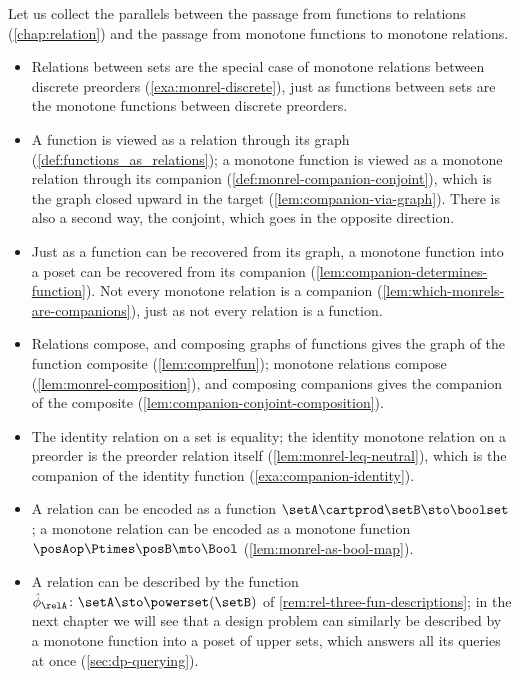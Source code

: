 Let us collect the parallels between the passage from functions to relations (\cref{chap:relation}) and the passage from monotone functions to monotone relations.
\begin{itemize}
    \item Relations between sets are the special case of monotone relations between discrete preorders (\cref{exa:monrel-discrete}), just as functions between sets are the monotone functions between discrete preorders.
    \item A function is viewed as a relation through its graph (\cref{def:functions_as_relations}); a monotone function is viewed as a monotone relation through its companion (\cref{def:monrel-companion-conjoint}), which is the graph closed upward in the target (\cref{lem:companion-via-graph}).
          There is also a second way, the conjoint, which goes in the opposite direction.
    \item Just as a function can be recovered from its graph, a monotone function into a poset can be recovered from its companion (\cref{lem:companion-determines-function}).
          Not every monotone relation is a companion (\cref{lem:which-monrels-are-companions}), just as not every relation is a function.
    \item Relations compose, and composing graphs of functions gives the graph of the function composite (\cref{lem:comprelfun}); monotone relations compose (\cref{lem:monrel-composition}), and composing companions gives the companion of the composite (\cref{lem:companion-conjoint-composition}).
    \item The identity relation on a set is equality; the identity monotone relation on a preorder is the preorder relation itself (\cref{lem:monrel-leq-neutral}), which is the companion of the identity function (\cref{exa:companion-identity}).
    \item A relation can be encoded as a function $\setA \cartprod \setB \sto \boolset$; a monotone relation can be encoded as a monotone function $\posAop \Ptimes \posB \mto \Bool$ (\cref{lem:monrel-as-bool-map}).
    \item A relation can be described by the function $\hat\phi_\relA \colon \setA \sto \powerset(\setB)$ of \cref{rem:rel-three-fun-descriptions}; in the next chapter we will see that a design problem can similarly be described by a monotone function into a poset of upper sets, which answers all its queries at once (\cref{sec:dp-querying}).
\end{itemize}


